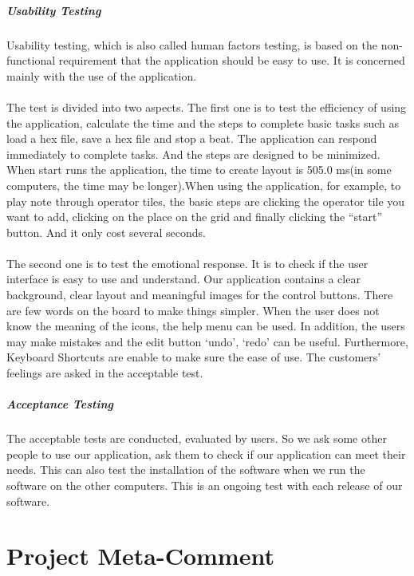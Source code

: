 \documentclass[10pt,a4paper]{article}
\begin{document}
\subsubsection{Usability Testing}
Usability testing, which is also called human factors testing, is based on the non-functional requirement that the application should be easy to use. It is concerned mainly with the use of the application.\\
\\
The test is divided into two aspects. The first one is to test the efficiency of using the application, calculate the time and the steps to complete basic tasks such as load a hex file, save a hex file and stop a beat. The application can respond immediately to complete tasks. And the steps are designed to be minimized. When start runs the application, the time to create layout is 505.0 ms(in some computers, the time may be longer).When using the application, for example, to play note through operator tiles, the basic steps are clicking the operator tile you want to add, clicking on the place on the grid and finally clicking the “start” button. And it only cost several seconds.\\
\\
The second one is to test the emotional response. It is to check if the user interface is easy to use and understand. Our application contains a clear background, clear layout and meaningful images for the control buttons. There are few words on the board to make things simpler. When the user does not know the meaning of the icons, the help menu can be used. In addition, the users may make mistakes and the edit button ‘undo’, ‘redo’ can be useful. Furthermore, Keyboard Shortcuts are enable to make sure the ease of use. The customers’ feelings are asked in the acceptable test. 

\subsubsection{Acceptance Testing}
The acceptable tests are conducted, evaluated by users. So we ask some other people to use our application, ask them to check if our application can meet their needs. This can also test the installation of the software when we run the software on the other computers. This is an ongoing test with each release of our software.
\pagebreak

\part{Project Meta-Comment}
\end{document}
